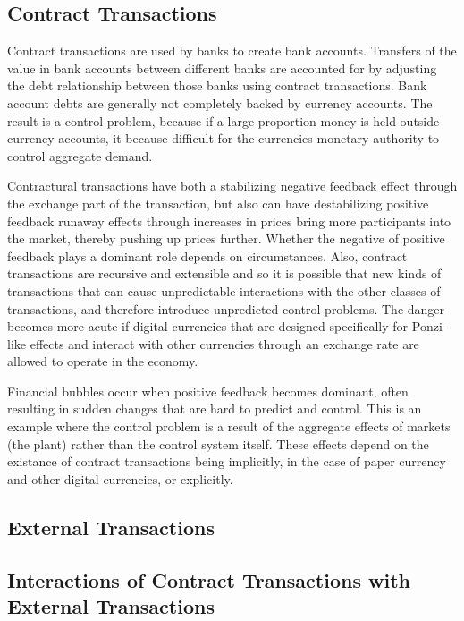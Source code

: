 \subsection{Contract Transactions}

Contract transactions are used by banks to create bank accounts. Transfers of the value in bank
accounts between different banks are accounted for by adjusting the debt relationship between those
banks using contract transactions. Bank account debts are generally not completely backed by
currency accounts. The result is a control problem, because if a large proportion money is held
outside currency accounts, it because difficult for the currencies monetary authority to control
aggregate demand.

Contractural transactions have both a stabilizing negative feedback effect through the exchange part
of the transaction, but also can have destabilizing positive feedback runaway effects through
increases in prices bring more participants into the market, thereby pushing up prices further.
Whether the negative of positive feedback plays a dominant role depends on circumstances. Also,
contract transactions are recursive and extensible and so it is possible that new kinds of
transactions that can cause unpredictable interactions with the other classes of transactions, and
therefore introduce unpredicted control problems. The danger becomes more acute if digital
currencies that are designed specifically for Ponzi-like effects and interact with other currencies
through an exchange rate are allowed to operate in the economy.

Financial bubbles occur when positive feedback becomes dominant, often resulting in sudden changes
that are hard to predict and control. This is an example where the control problem is a result of
the aggregate effects of markets (the plant) rather than the control system itself. These effects
depend on the existance of contract transactions being implicitly, in the case of paper currency and
other digital currencies, or explicitly.

\subsection{External Transactions}

\subsection{Interactions of Contract Transactions with External Transactions}

